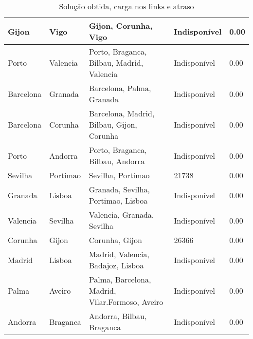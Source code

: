 \begin{table}[!htb]
{\begin{tabular}{|l|l|l|l|l|}
Gijon & Vigo & Gijon, Corunha, Vigo & Indisponível & 0.00 \\ \hline
Porto & Valencia & Porto, Braganca, Bilbau, Madrid, Valencia & Indisponível & 0.00 \\ \hline
Barcelona & Granada & Barcelona, Palma, Granada & Indisponível & 0.00 \\ \hline
Barcelona & Corunha & Barcelona, Madrid, Bilbau, Gijon, Corunha & Indisponível & 0.00 \\ \hline
Porto & Andorra & Porto, Braganca, Bilbau, Andorra & Indisponível & 0.00 \\ \hline
Sevilha & Portimao & Sevilha, Portimao & 21738 & 0.00 \\ \hline
Granada & Lisboa & Granada, Sevilha, Portimao, Lisboa & Indisponível & 0.00 \\ \hline
Valencia & Sevilha & Valencia, Granada, Sevilha & Indisponível & 0.00 \\ \hline
Corunha & Gijon & Corunha, Gijon & 26366 & 0.00 \\ \hline
Madrid & Lisboa & Madrid, Valencia, Badajoz, Lisboa & Indisponível & 0.00 \\ \hline
Palma & Aveiro & Palma, Barcelona, Madrid, Vilar.Formoso, Aveiro & Indisponível & 0.00 \\ \hline
Andorra & Braganca & Andorra, Bilbau, Braganca & Indisponível & 0.00 \\ \hline
\end{tabular}}
\caption[]{Solução obtida, carga nos links e atraso}
\end{table}

\begin{table}[!htb]
        \centering
\caption[]{Solução obtida, carga nos links e atraso}
\end{table}

